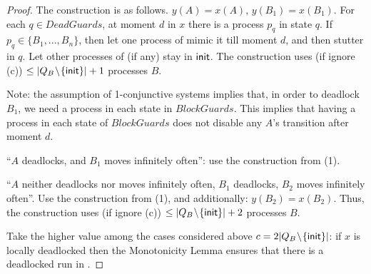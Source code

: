 \begin{proof}
The construction is as follows.
\li
  \-[a.] $y(A)=x(A)$, $y(B_1)=x(B_1)$.
  \-[b.] For each $q \in DeadGuards$, at moment $d$ in $x$
         there is a process $p_q$ in state $q$. 
         If $p_q \in \{B_1,...,B_n\}$, 
         then let one process of \cutoffsys mimic it till moment $d$, 
         and then stutter in $q$.
  \-[c.] Let other processes of \cutoffsys (if any) stay in ${\sf init}$.
\il
The construction uses (if ignore (c)) $\leq |Q_B\!\setminus\! \{ {\sf init} \}|+1$ processes $B$.

Note: 
the assumption of 1-conjunctive systems implies that,
in order to deadlock $B_1$,
we need a process in each state in $BlockGuards$.
This implies that having a process in each state of $BlockGuards$ does not disable 
any $A$'s transition after moment $d$.

 ``$A$ deadlocks, and $B_1$ moves infinitely often'': 
use the construction from (1).

``$A$ neither deadlocks nor moves infinitely often, 
  $B_1$ deadlocks, $B_2$ moves infinitely often''. 
Use the construction from (1), and additionally: $y(B_2)=x(B_2)$. 
Thus, the construction uses (if ignore (c)) $\leq |Q_B \!\setminus\! \{ {\sf init} \}|+2$ 
processes $B$.

Take the higher value among the cases considered above $c=2|Q_B\!\setminus\! \{ {\sf init} \}|$: 
if $x$ is locally deadlocked then the Monotonicity Lemma ensures 
that there is a deadlocked run in \cutoffsys.
\end{proof}


